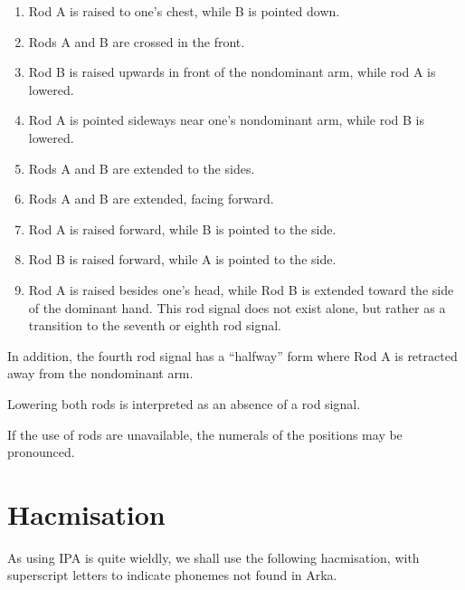 \documentclass{book}
\begin{document}
\begin{enumerate}
    \item Rod A is raised to one's chest, while B is pointed down.
    \item Rods A and B are crossed in the front.
    \item Rod B is raised upwards in front of the nondominant arm, while rod A is lowered.
    \item Rod A is pointed sideways near one's nondominant arm, while rod B is lowered.
    \item Rods A and B are extended to the sides.
    \item Rods A and B are extended, facing forward.
    \item Rod A is raised forward, while B is pointed to the side.
    \item Rod B is raised forward, while A is pointed to the side.
    \item Rod A is raised besides one's head, while Rod B is extended toward the side of the dominant hand. This rod signal does not exist alone, but rather as a transition to the seventh or eighth rod signal.
\end{enumerate}

In addition, the fourth rod signal has a ``halfway'' form where Rod A is retracted away from the nondominant arm.

Lowering both rods is interpreted as an absence of a rod signal.

If the use of rods are unavailable, the numerals of the positions may be pronounced.

\section{Hacmisation}

As using IPA is quite wieldly, we shall use the following hacmisation, with superscript letters to indicate phonemes not found in Arka.
\end{document}
